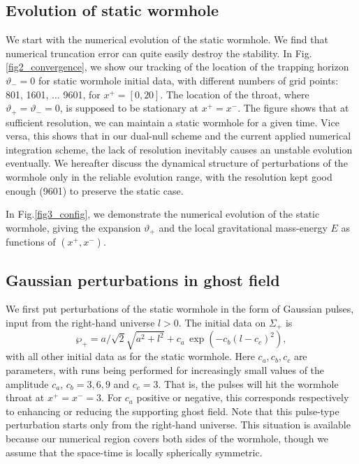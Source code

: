 \documentclass[aps,showpacs,twocolumn,draft,eqsecnum]{revtex4}
\begin{document}
\subsection{Evolution of static wormhole}
We start with the numerical evolution of the static wormhole. We find that
numerical truncation error can quite easily destroy the stability. In
Fig.\ref{fig2_convergence}, we show our tracking of the location of the
trapping horizon $\vartheta_-=0$ for static wormhole initial data, with
different numbers of grid points: 801, 1601, $\ldots$ 9601, for $x^+=[0,20]$.
The location of the throat, where $\vartheta_+=\vartheta_-=0$, is supposed to
be stationary at $x^+=x^-$.  The figure shows that at sufficient resolution, we
can maintain a static wormhole for a given time. Vice versa, this shows that in
our dual-null scheme and the current applied numerical integration scheme, the
lack of resolution inevitably causes an unstable evolution eventually. We
hereafter discuss the dynamical structure of perturbations of the wormhole only
in the reliable evolution range, with the resolution kept good enough (9601) to
preserve the static case.

In  Fig.\ref{fig3_config}, we demonstrate the numerical evolution of the static
wormhole, giving the expansion $\vartheta_+$ and the local gravitational
mass-energy $E$ as functions of $(x^+, x^-)$.

\subsection{Gaussian perturbations in ghost field}
We first put perturbations of the static wormhole in the form of Gaussian
pulses, input from the right-hand universe $l>0$. The initial data on
$\Sigma_+$ is
\begin{equation}
\wp_+=  a/\sqrt2\sqrt{a^2+l^2} + c_a \, \exp (-c_b(l-c_c)^2), \label{pulseeq}
\end{equation}
with all other initial data as for the static wormhole. Here $c_a,c_b,c_c$ are
parameters, with runs being performed for increasingly small values of the
amplitude $c_a$, $c_b=3,6,9$ and $c_c=3$. That is, the pulses will hit the
wormhole throat at $x^+=x^-=3$. For $c_a$ positive or negative, this
corresponds respectively to enhancing or reducing the supporting ghost field.
Note that this pulse-type perturbation starts only from the right-hand
universe. This situation is available because our numerical region covers both
sides of the wormhole, though we assume that the space-time is locally
spherically symmetric.
\end{document}
